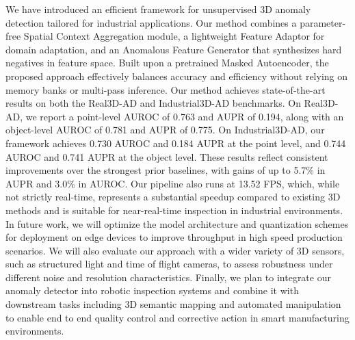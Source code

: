 We have introduced an efficient framework for unsupervised 3D anomaly detection tailored for industrial applications. Our method combines a parameter-free Spatial Context Aggregation module, a lightweight Feature Adaptor for domain adaptation, and an Anomalous Feature Generator that synthesizes hard negatives in feature space. Built upon a pretrained Masked Autoencoder, the proposed approach effectively balances accuracy and efficiency without relying on memory banks or multi-pass inference. Our method achieves state-of-the-art results on both the Real3D-AD and Industrial3D-AD benchmarks. On Real3D-AD, we report a point-level AUROC of 0.763 and AUPR of 0.194, along with an object-level AUROC of 0.781 and AUPR of 0.775. On Industrial3D-AD, our framework achieves 0.730 AUROC and 0.184 AUPR at the point level, and 0.744 AUROC and 0.741 AUPR at the object level. These results reflect consistent improvements over the strongest prior baselines, with gains of up to 5.7\% in AUPR and 3.0\% in AUROC. Our pipeline also runs at 13.52 FPS, which, while not strictly real-time, represents a substantial speedup compared to existing 3D methods and is suitable for near-real-time inspection in industrial environments. In future work, we will optimize the model architecture and quantization schemes for deployment on edge devices to improve throughput in high speed production scenarios. We will also evaluate our approach with a wider variety of 3D sensors, such as structured light and time of flight cameras, to assess robustness under different noise and resolution characteristics. Finally, we plan to integrate our anomaly detector into robotic inspection systems and combine it with downstream tasks including 3D semantic mapping and automated manipulation to enable end to end quality control and corrective action in smart manufacturing environments.
